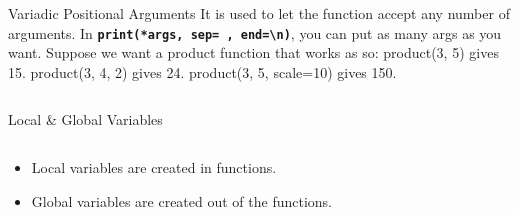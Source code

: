         \begin{frame}{Variadic Positional Arguments}
            It is used to let the function accept any number of arguments.
            \newline
            In \textbf{\texttt{print(*args, sep=\textquotesingle \ \textquotesingle, end=\textquotesingle \textbackslash n\textquotesingle )}}, 
            you can put as many args as you want.
            \newline 
            \newline Suppose we want a product function that works as so:
            \newline product(3, 5) gives 15.
            \newline product(3, 4, 2) gives 24.
            \newline product(3, 5, scale=10) gives 150.
            \newline 
            \inputminted[frame=single,framesep=2pt, lastline=15]{python3}{code-examples/variadic.py}
        \end{frame}

        \begin{frame}{Local \& Global Variables}
            \begin{columns}
                \begin{column}{0.50\textwidth}
                    \begin{itemize}
                        \item Local variables are created in functions.
                        \item Global variables are created out of the functions.
                    \end{itemize}
                    \inputminted[frame=single,framesep=2pt, lastline=15]{python3}{code-examples/var.py}
                \end{column}
                \begin{column}{0.50\textwidth}
                    \inputminted[frame=single,framesep=2pt, lastline=15]{python3}{code-examples/var2.py}                    
                    \inputminted[frame=single,framesep=2pt, lastline=15]{python3}{code-examples/var3.py}                    
                \end{column}
            \end{columns}
        \end{frame}

